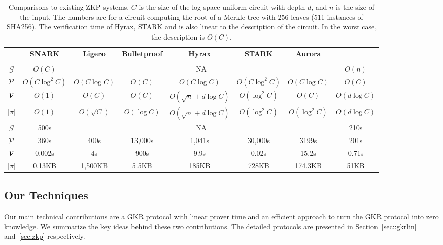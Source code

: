 \begin{table}[h]
    \vspace{-.2in}
	\centering
	{\fontsize{8}{8}
	\begin{tabular}{|c|c|c|c|c|c|c|c|}
		
		\hline
		&\textbf{SNARK}&\textbf{Ligero}&\textbf{Bulletproof}&\textbf{Hyrax}&\textbf{STARK}&\textbf{Aurora}&\name\\
		&\cite{libsnark}&\cite{ligero}&\cite{bulletproofs}&\cite{hyrax}&\cite{libstark}&\cite{aurora}&\\
		\hline
		\hline
		$\mathcal{G}$&$O(C)$&\multicolumn{5}{c|}{NA}&$O(n)$\\
		\hline
		$\P$&$O(C\log^2C)$&$O(C\log C)$&$O(C)$&$O(C\log C)$&$O(C\log^2 C)$&$O(C\log C)$ &$O(C)$\\
		\hline
		$\V$&$O(1)$&$O(C)$&$O(C)$&$O(\sqrt{n}+d\log C)$&$O(\log^2 C)$&$O(C)$&$O(d\log C)$\\
		\hline
		$|\pi|$&$O(1)$&$O(\sqrt{C})$&$O(\log C)$&$O(\sqrt{n}+d\log C)$&$O(\log^2 C)$& $O(\log^2 C)$&$O(d\log C)$\\
		\hline
		\hline
		$\mathcal{G}$&500s&\multicolumn{5}{c|}{NA}&210s\\
		\hline
		$\P$&360s&400s&13,000s&1,041s&30,000s&3199s&201s\\
		\hline
			$\V$&0.002s&4s&900s&9.9s&0.02s&15.2s&0.71s\\
		\hline
		$|\pi|$&0.13KB&1,500KB&5.5KB&185KB&728KB&174.3KB&51KB\\
		\hline
	\end{tabular}
}

\caption{Comparisons to existing ZKP systems. $C$ is the size of the log-space uniform circuit with depth $d$, and $n$ is the size of the input. The numbers are for a circuit computing the root of a Merkle tree with 256 leaves (511 instances of SHA256). The verification time of Hyrax, STARK and \name is also linear to the description of the circuit. In the worst case, the description is $O(C)$.\protect\footnotemark}\label{tab:zkpall}
\vspace{-0.5in}
\end{table}

\subsection{Our Techniques}
Our main technical contributions are a GKR protocol with linear prover time and an efficient approach to turn the GKR protocol into zero knowledge. We summarize the key ideas behind these two contributions. The detailed protocols are presented in Section~\ref{sec::gkrlin} and~\ref{sec:zkp} respectively.

